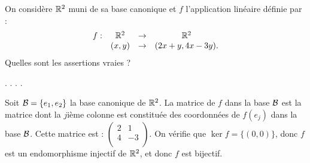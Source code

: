 \begin{question}
On considère $\mathbb{R}^2$ muni de sa base canonique et $f$ l'application linéaire définie par :
$$\begin{array}{rccc}f:&\mathbb{R}^2 &\to& \mathbb{R}^2\\
& (x,y)&\to &(2x+y,4x-3y).\end{array}$$
Quelles sont les assertions vraies ?
\begin{answers}  
.
.
.
.
\end{answers}
\begin{explanations} Soit ${\cal {B}}=\{e_1,e_2\}$ la base canonique de $\mathbb{R}^2$. La matrice de $f$ dans la base  ${\cal {B}}$ est la matrice  dont la $j$ième colonne est constituée des coordonnées de  $f(e_j)$ dans la base ${\cal {B}}$. Cette matrice est : 
 $
\left(\begin{array}{rc}
2&1\\
4&-3\\ 
\end{array}\right)$.
\vskip0mm
On vérifie que $\ker f=\{(0,0)\}$, donc $f$ est un endomorphisme  injectif de $\mathbb{R}^2$, 
et donc $f$ est bijectif.
\end{explanations}
\end{question}



